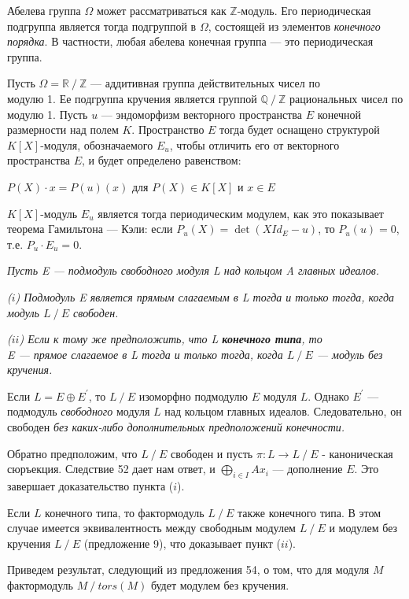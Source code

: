 Абелева группа $\Omega$ может рассматриваться как $\mathbb{Z}$-модуль. Его периодическая подгруппа является тогда подгруппой в $\Omega$, состоящей из элементов \textit{конечного порядка}. В частности, любая абелева конечная группа — это периодическая группа.

Пусть $\Omega = \mathbb{R~/~Z}$ — аддитивная группа действительных чисел по \\ модулю 1. Ее подгруппа кручения является группой $\mathbb{Q~/~Z}$ рациональных чисел по модулю 1.
Пусть $u$ — эндоморфизм векторного пространства $E$ конечной размерности над полем $K$. Пространство $E$ тогда будет оснащено структурой $K[X]$-модуля, обозначаемого $E_u$, чтобы отличить его от векторного пространства $E$, и будет определено равенством:
\begin{center}
 $P(X) \cdot x = P(u)(x)$ для $P(X) \in K[X]$ и $x \in E$
\end{center}

\noindent $K[X]$-модуль $E_u$ является тогда периодическим модулем, как это показывает теорема Гамильтона — Кэли: если 
$P_u(X) = \det(XId_E - u)$, то $P_u(u) = 0$, т.е. $P_u \cdot E_u = 0$.

\begin{predl}

\textit{Пусть E — подмодуль свободного модуля L над кольцом A главных идеалов.}

\textit{ ($i$) Подмодуль E является прямым слагаемым в L тогда и только тогда, когда модуль $L~/~E$ свободен.}

\textit{ ($ii$) Если к тому же предположить, что L \textbf{конечного типа}, то \\ E — прямое слагаемое в L тогда и только тогда, когда $L~/~E$ — модуль без кручения.}\\
\end{predl}
\begin{myproof}
Если $L = E \oplus E^{'}$, то $L~/~E$ изоморфно подмодулю $E$ модуля $L$. Однако $E^{'}$ — подмодуль \textit{свободного} модуля $L$ над кольцом главных идеалов. Следовательно, он свободен \textit{без каких-либо дополнительных предположений конечности.}

\noindent Обратно предположим, что $L~/~E$ свободен и пусть $ \pi : L \rightarrow L~/~E$ - каноническая сюръекция. Следствие 52 дает нам ответ, и $\bigoplus_{i \in I} Ax_i $ — дополнение $E$. Это завершает доказательство пункта ($i$).

\noindent Если $L$ конечного типа, то фактормодуль $L~/~E$ также конечного типа. В этом случае имеется эквивалентность между свободным модулем $L~/~E$ и модулем без кручения $L~/~E$ (предложение 9), что доказывает пункт ($ii$).

Приведем результат, следующий из предложения 54, о том, что для модуля $M$ фактормодуль $M~/~tors(M)$ будет модулем без кручения.
\end{myproof}

